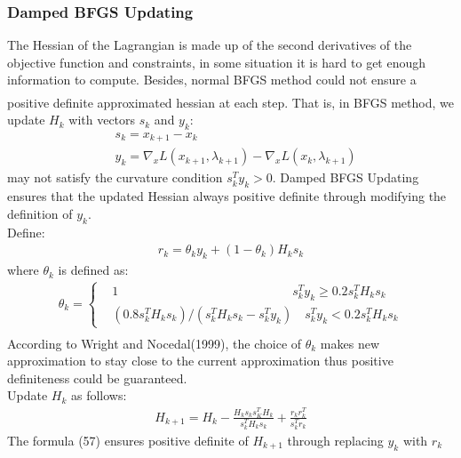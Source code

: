 \documentclass{article}
\newcommand{\upcite}[1]{\textsuperscript{\textsuperscript{\cite{#1}}}}
\begin{document}
\begin{spacing}{1.5}
\subsubsection{Damped BFGS Updating}
The Hessian of the Lagrangian is made up of the second derivatives of the objective function and constraints, in some situation it is hard to get enough information to compute. Besides, normal BFGS method could not ensure a positive definite approximated hessian at each step\upcite{Ref7}. That is, in BFGS method, we update $H_k$ with vectors $s_k$ and $y_k$:
\begin{align}
&s_k=x_{k+1}-x_k\\
&y_k=\nabla_xL(x_{k+1},\lambda_{k+1})-\nabla_xL(x_k,\lambda_{k+1})
\end{align} 
may not satisfy the curvature condition $s_k^Ty_k>0$. Damped BFGS Updating ensures that the updated Hessian always positive definite through modifying the definition of $y_k$.\\
Define:
\begin{align}
r_k=\theta_ky_k+(1-\theta_k)H_ks_k
\end{align}
where $\theta_k$ is defined as:
\begin{align}
\theta_k=
\left\{
\begin{aligned}
&1\qquad \qquad \qquad \qquad \qquad \qquad \qquad s_k^Ty_k\ge0.2s_k^TH_ks_k\\
&(0.8s_k^TH_ks_k)/(s_k^TH_ks_k-s_k^Ty_k) \quad s_k^Ty_k<0.2s_k^TH_ks_k
\end{aligned}
\right.
\end{align}
According to Wright and Nocedal(1999)\upcite{Ref7}, the choice of $\theta_k$ makes new approximation to stay close to the current approximation thus positive definiteness could be guaranteed.\\
Update $H_k$ as follows:
\begin{align}
H_{k+1}=H_k-\frac{H_ks_ks_K^TH_k}{s_k^TH_ks_k}+\frac{r_kr_k^T}{s_k^Tr_k}
\end{align}
The formula (57) ensures positive definite of $H_{k+1}$ through replacing $y_k$ with $r_k$






\end{spacing}
\end{document}
